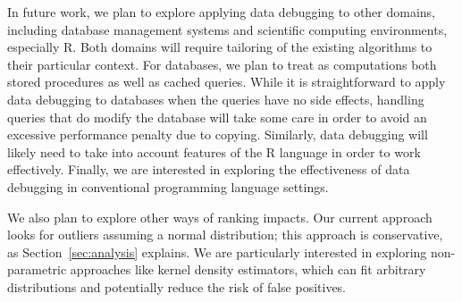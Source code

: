 In future work, we plan to explore applying data debugging to other
domains, including database management systems and scientific
computing environments, especially R. Both domains will require
tailoring of the existing algorithms to their particular context. For
databases, we plan to treat as computations both stored procedures as
well as cached queries. While it is straightforward to apply data
debugging to databases when the queries have no side effects, handling
queries that do modify the database will take some care in order to
avoid an excessive performance penalty due to copying.  Similarly,
data debugging will likely need to take into account features of the R
language in order to work effectively. Finally, we are interested in
exploring the effectiveness of data debugging in conventional programming
language settings.

We also plan to explore other ways of ranking impacts. Our current
approach looks for outliers assuming a normal distribution; this
approach is conservative, as Section~\ref{sec:analysis} explains. We
are particularly interested in exploring non-parametric approaches
like kernel density estimators, which can fit arbitrary distributions
and potentially reduce the risk of false positives.
